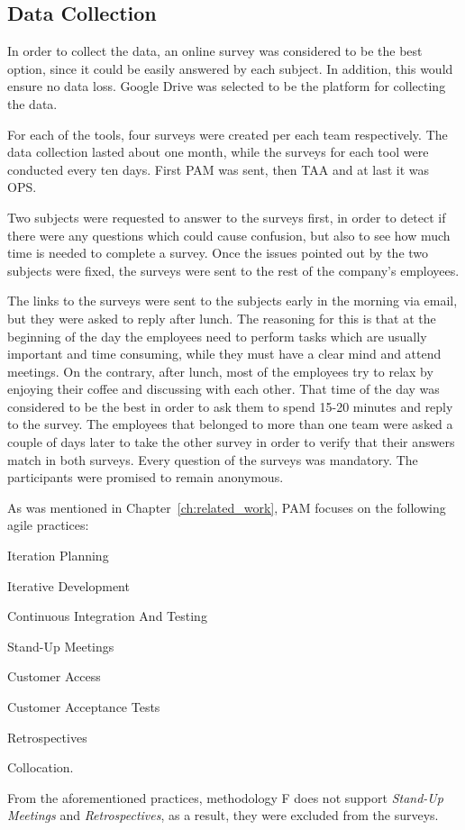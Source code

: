 \subsection{Data Collection}
In order to collect the data, an online survey was considered to be the best option, since it could be easily answered by each subject. In addition, this would ensure no data loss. Google Drive\texttrademark \cite{google_drive} was selected to be the platform for collecting the data.

For each of the tools, four surveys were created per each team respectively. The data collection lasted about one month, while the surveys for each tool were conducted every ten days. First \ac{PAM} was sent, then \ac{TAA} and at last it was \ac{OPS}.

Two subjects were requested to answer to the surveys first, in order to detect if there were any questions which could cause confusion, but also to see how much time is needed to complete a survey. Once the issues pointed out by the two subjects were fixed, the surveys were sent to the rest of the company's employees.

The links to the surveys were sent to the subjects early in the morning via email, but they were asked to reply after lunch. The reasoning for this is that at the beginning of the day the employees need to perform tasks which are usually important and time consuming, while they must have a clear mind and attend meetings. On the contrary, after lunch, most of the employees try to relax by enjoying their coffee and discussing with each other. That time of the day was considered to be the best in order to ask them to spend 15-20 minutes and reply to the survey. The employees that belonged to more than one team were asked a couple of days later to take the other survey in order to verify that their answers match in both surveys. Every question of the surveys was mandatory. The participants were promised to remain anonymous.

As was mentioned in Chapter~\ref{ch:related_work}, \ac{PAM} focuses on the following agile practices:
\begin{inparaenum} [a\upshape)]
	\item Iteration Planning
	\item Iterative Development
	\item Continuous Integration And Testing
	\item Stand-Up Meetings
	\item Customer Access
	\item Customer Acceptance Tests
	\item Retrospectives
	\item Collocation.
\end{inparaenum}
From the aforementioned practices, methodology F does not support \textit{Stand-Up Meetings} and \textit{Retrospectives}, as a result, they were excluded from the surveys.

